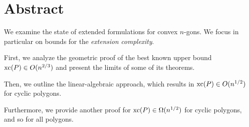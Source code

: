 \section*{Abstract}

We examine the state of extended formulations for convex $n$-gons. We focus in particular on bounds for the \emph{extension complexity}.

First, we analyze the geometric proof of the best known upper bound $\operatorname{xc}(P) \in O(n^{2/3})$ and present the limits of some of its theorems.

Then, we outline the linear-algebraic approach, which results in $\operatorname{xc}(P) \in O(n^{1/2})$ for cyclic polygons.

Furthermore, we provide another proof for $\operatorname{xc}(P) \in \Omega(n^{1/2})$ for cyclic polygons, and so for all polygons.
